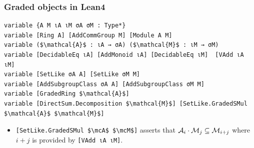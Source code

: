 \documentclass[9pt]{beamer}
\begin{document}
\begin{frame}[fragile]
\frametitle{Graded objects in Lean4}

\begin{lstlisting}[mathescape=true, extendedchars=true]
variable {A M ιA ιM σA σM : Type*} 
variable [Ring A] [AddCommGroup M] [Module A M]
variable ($\mathcal{A}$ : ιA → σA) ($\mathcal{M}$ : ιM → σM)
variable [DecidableEq ιA] [AddMonoid ιA] [DecidableEq ιM]  [VAdd ιA ιM]
variable [SetLike σA A] [SetLike σM M]
variable [AddSubgroupClass σA A] [AddSubgroupClass σM M] 
variable [GradedRing $\mathcal{A}$] 
variable [DirectSum.Decomposition $\mathcal{M}$] [SetLike.GradedSMul $\mathcal{A}$ $\mathcal{M}$]
\end{lstlisting}
\begin{itemize}
  \item \lstinline[mathescape=true]|[SetLike.GradedSMul $\mcA$ $\mcM$]| asserts that $\mathcal{A}_i \cdot \mathcal{M}_j \subseteq \mathcal{M}_{i+j}$ where $i + j$ is provided by \lstinline|[VAdd ιA ιM]|. 
\end{itemize}
\end{frame}
\end{document}
